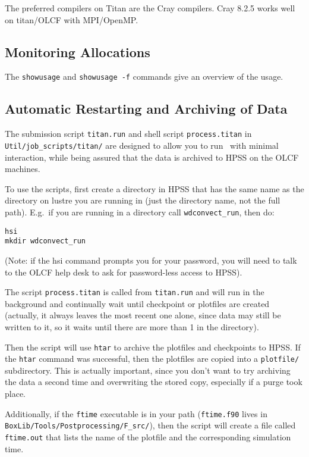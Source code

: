 The preferred compilers on Titan are the Cray compilers.  
Cray 8.2.5 works well on titan/OLCF with MPI/OpenMP.


\subsection{Monitoring Allocations}

The {\tt showusage} and {\tt showusage -f} commands give an
overview of the usage.

\subsection{Automatic Restarting and Archiving of Data}

The submission script {\tt titan.run} and shell script
{\tt process.titan} in {\tt Util/job\_scripts/titan/}
are designed to allow you to run \maestro\ with minimal interaction,
while being assured that the data is archived to HPSS on the OLCF
machines.

To use the scripts, first create a directory in HPSS that has the same
name as the directory on lustre you are running in (just the directory
name, not the full path).  E.g.\ if you are running in a directory
call {\tt wdconvect\_run}, then do:
\begin{verbatim}
hsi
mkdir wdconvect_run
\end{verbatim}
(Note: if the hsi command prompts you for your password, you will need to
talk to the OLCF help desk to ask for password-less access to HPSS).

The script {\tt process.titan} is called from {\tt titan.run} and
will run in the background and continually wait until checkpoint or
plotfiles are created (actually, it always leaves the most recent one
alone, since data may still be written to it, so it waits until there
are more than 1 in the directory).

Then the script will use {\tt htar} to archive the plotfiles and checkpoints
to HPSS.  If the {\tt htar} command was successful, then the plotfiles are
copied into a {\tt plotfile/} subdirectory.  This is actually important,
since you don't want to try archiving the data a second time and
overwriting the stored copy, especially if a purge took place.

Additionally, if the {\tt ftime} executable is in your path 
({\tt ftime.f90} lives in {\tt BoxLib/Tools/Postprocessing/F\_src/}), then the
script will create a file called {\tt ftime.out} that lists the name of the
plotfile and the corresponding simulation time.

